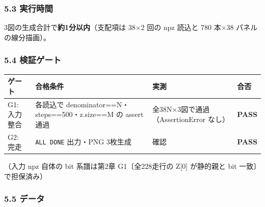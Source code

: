 \documentclass[
  a4paper,
]{ltjsarticle}
\newcounter{none} %
\begin{document}
\subsubsection{5.3 実行時間}\label{ux5b9fux884cux6642ux9593}

3図の生成合計で\textbf{約1分以内}（支配項は 38×2 回の npz 読込と 780
本×38 パネルの線分描画）。

\subsubsection{5.4 検証ゲート}\label{ux691cux8a3cux30b2ux30fcux30c8}

{\def\LTcaptype{none} %
\begin{longtable}[]{@{}
  >{\raggedright\arraybackslash}p{}
  >{\raggedright\arraybackslash}p{}
  >{\raggedright\arraybackslash}p{}
  >{\raggedright\arraybackslash}p{}@{}}
\toprule\noalign{}
\begin{minipage}[b]{\linewidth}\raggedright
ゲート
\end{minipage} & \begin{minipage}[b]{\linewidth}\raggedright
合格条件
\end{minipage} & \begin{minipage}[b]{\linewidth}\raggedright
実測
\end{minipage} & \begin{minipage}[b]{\linewidth}\raggedright
合否
\end{minipage} \\
\midrule\noalign{}
\endhead
\bottomrule\noalign{}
\endlastfoot
G1: 入力整合 & 各読込で denominator==N・steps==500・z.size==M の assert
通過 & 全38N×3図で通過（AssertionError なし） & \textbf{PASS} \\
G2: 完走 & \texttt{ALL\ DONE} 出力・PNG 3枚生成 & 確認 &
\textbf{PASS} \\
\end{longtable}
}

（入力 npz 自体の bit 系譜は第2章 G1〔全228走行の Z{[}0{]} が静的親と
bit 一致〕で担保済み）

\subsubsection{5.5 データ}\label{ux30c7ux30fcux30bf}
\end{document}
